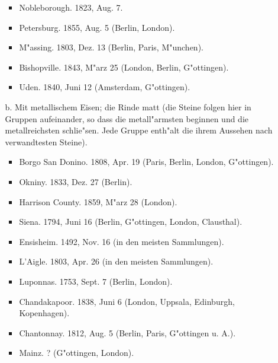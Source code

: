\documentclass[a4paper, 11pt, oneside]{article}
\begin{document}
\begin{itemize}
\begin{itemize}
\begin{itemize}
            \item Nobleborough. 1823, Aug. 7.
        
            \item Petersburg. 1855, Aug. 5 (Berlin, London).
        
            \item M"assing. 1803, Dez. 13 (Berlin, Paris, M"unchen).
        
            \item Bishopville. 1843, M"arz 25 (London, Berlin, G"ottingen).
        
            \item Uden. 1840, Juni 12 (Amsterdam, G"ottingen). 
        \end{itemize}
        \item[b.] Mit metallischem Eisen; die Rinde matt (die Steine folgen hier in Gruppen aufeinander, so dass die metall"armsten beginnen und die metallreichsten schlie"sen. Jede Gruppe enth"alt die ihrem Aussehen nach verwandtesten Steine).
        \begin{itemize}
            \item Borgo San Donino. 1808, Apr. 19 (Paris, Berlin, London, G"ottingen).

            \item Okniny. 1833, Dez. 27 (Berlin).
        
            \item Harrison County. 1859, M"arz 28 (London).
        
            \item Siena. 1794, Juni 16 (Berlin, G"ottingen, London, Clausthal).
        
            \item Ensisheim. 1492, Nov. 16 (in den meisten Sammlungen).
        
            \item L'Aigle. 1803, Apr. 26 (in den meisten Sammlungen).
        
            \item Luponnas. 1753, Sept. 7 (Berlin, London).
        
            \item Chandakapoor. 1838, Juni 6 (London, Uppsala, Edinburgh, Kopenhagen).
        
            \item Chantonnay. 1812, Aug. 5 (Berlin, Paris, G"ottingen u. A.).
        
            \item Mainz. ? (G"ottingen, London).
        

\end{itemize}
\end{itemize}
\end{itemize}
\end{document}
